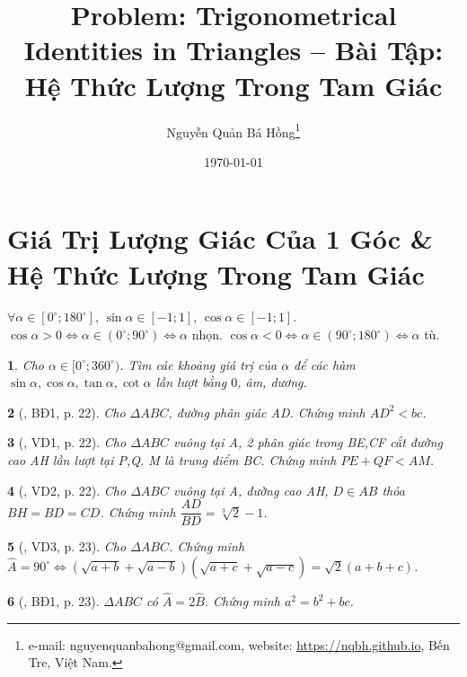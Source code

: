 \documentclass{article}
\title{Problem: Trigonometrical Identities in Triangles -- Bài Tập: Hệ Thức Lượng Trong Tam Giác}
\author{Nguyễn Quản Bá Hồng\footnote{e-mail: {\sf nguyenquanbahong@gmail.com}, website: \url{https://nqbh.github.io}, Bến Tre, Việt Nam.}}
\date{\today}
\newtheorem{baitoan}{}
\begin{document}
\maketitle
\tableofcontents


\section{Giá Trị Lượng Giác Của 1 Góc \& Hệ Thức Lượng Trong Tam Giác}
 $\forall\alpha\in[0^\circ;180^\circ]$, $\sin\alpha\in[-1;1]$, $\cos\alpha\in[-1;1]$.  $\cos\alpha > 0\Leftrightarrow\alpha\in(0^\circ;90^\circ)\Leftrightarrow\alpha$ nhọn. $\cos\alpha < 0\Leftrightarrow\alpha\in(90^\circ;180^\circ)\Leftrightarrow\alpha$ tù.

\begin{baitoan}
	Cho $\alpha\in[0^\circ;360^\circ)$. Tìm các khoảng giá trị của $\alpha$ để các hàm $\sin\alpha,\cos\alpha,\tan\alpha,\cot\alpha$ lần lượt bằng $0$, âm, dương.
\end{baitoan}

\begin{baitoan}[\cite{Hai_Hung_Thu_Tung2022_tap_1}, BĐ1, p. 22]
	Cho $\Delta ABC$, đường phân giác AD. Chứng minh $AD^2 < bc$.
\end{baitoan}

\begin{baitoan}[\cite{Hai_Hung_Thu_Tung2022_tap_1}, VD1, p. 22]
	Cho $\Delta ABC$ vuông tại A, 2 phân giác trong BE,CF cắt đường cao AH lần lượt tại P,Q. M là trung điểm BC. Chứng minh $PE + QF < AM$.
\end{baitoan}

\begin{baitoan}[\cite{Hai_Hung_Thu_Tung2022_tap_1}, VD2, p. 22]
	Cho $\Delta ABC$ vuông tại A, đường cao AH, $D\in AB$ thỏa $BH = BD = CD$. Chứng minh $\dfrac{AD}{BD} = \sqrt[3]{2} - 1$.
\end{baitoan}

\begin{baitoan}[\cite{Hai_Hung_Thu_Tung2022_tap_1}, VD3, p. 23]
	Cho $\Delta ABC$. Chứng minh $\widehat{A} = 90^\circ\Leftrightarrow(\sqrt{a + b} + \sqrt{a - b})(\sqrt{a + c} + \sqrt{a - c}) = \sqrt{2}(a + b + c)$.
\end{baitoan}

\begin{baitoan}[\cite{Hai_Hung_Thu_Tung2022_tap_1}, BĐ1, p. 23]
	$\Delta ABC$ có $\widehat{A} = 2\widehat{B}$. Chứng minh $a^2 = b^2 + bc$.
\end{baitoan}
\end{document}
